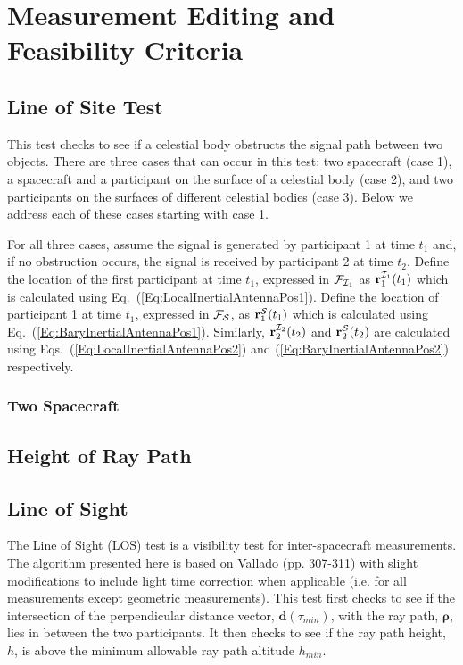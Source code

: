 \section{Measurement Editing and Feasibility Criteria}

\subsection{Line of Site Test}

This test checks to see if a celestial body obstructs the signal path between two objects.  There are three cases that can occur in this test: two spacecraft (case 1), a spacecraft and a participant on the surface of a celestial body (case 2), and two participants on the surfaces of different celestial bodies (case 3).  Below we address each of these cases starting with case 1.

For all three cases, assume the signal is generated by participant 1 at time $t_1$ and, if no obstruction occurs, the signal is received by participant 2 at time $t_2$. Define the location of the first participant at time $t_1$, expressed in $\mcF_{\mcI_1}$ as $\mathbf{r}_1^{\mcI_1}(t_1)$ which is calculated using Eq.~(\ref{Eq:LocalInertialAntennaPos1}). Define the location of participant 1 at time $t_1$, expressed in $\mcF_{\mcS}$, as $\mathbf{r}_1^{\mcS}(t_1)$ which is calculated using Eq.~(\ref{Eq:BaryInertialAntennaPos1}). Similarly, $\mathbf{r}_2^{\mcI_2}(t_2)$ and $\mathbf{r}_2^{\mcS}(t_2)$ are calculated using Eqs.~(\ref{Eq:LocalInertialAntennaPos2}) and (\ref{Eq:BaryInertialAntennaPos2}) respectively.


\subsubsection{Two Spacecraft}





\subsection{Height of Ray Path}



\subsection{Line of Sight}

The Line of Sight (LOS) test is a visibility test for inter-spacecraft measurements.
The algorithm presented here is based on Vallado\cite{vallado3} (pp. 307-311) with slight modifications to include light time correction when applicable (i.e. for all measurements except geometric measurements). This test first checks to see if the intersection of the perpendicular distance vector, $\mathbf{d}(\tau_{min})$,  with the ray path, $\boldsymbol{\rho}$, lies in between the two participants. It then checks to see if the ray path height, $h$, is above the minimum allowable ray path altitude $h_{min}$.


